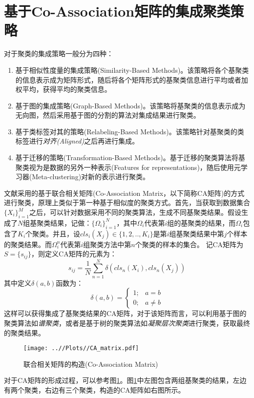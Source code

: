 \documentclass[UTF8, 12pt]{ctexart}
\begin{document}
\section{基于Co-Association矩阵的集成聚类策略}
	对于聚类的集成策略一般分为四种\cite{zhou2012ensemble}：
	\begin{enumerate}
		\item 基于相似性度量的集成策略(Similarity-Based Methods)。该策略将各个基聚类的信息表示成为矩阵形式，随后将各个矩阵形式的基聚类信息进行平均或者加权平均，获得平均的聚类信息。
		\item 基于图的集成策略(Graph-Based Methods)。该策略将基聚类的信息表示成为无向图，然后采用基于图的分割的算法对集成结果进行聚类。
		\item 基于类标签对其的策略(Relabeling-Based Methods)。该策略针对基聚类的类标签进行\emph{对齐(Aligned)}之后再进行集成。
		\item 基于迁移的策略(Transformation-Based Methods)。基于迁移的聚类算法将基聚类视为是数据的另外一种表示(Features for representations)，随后使用元学习器(Meta-clustering)对新的表示进行聚类。
	\end{enumerate}
	文献\cite{huang2017locally}采用的基于联合相关矩阵(Co-Association Matrix，以下简称CA矩阵)的方式进行聚类，原理上类似于第一种基于相似度的聚类方式。首先，当获取到数据集合$\{X_{i}\}_{i=1}^{M}$之后，可以针对数据采用不同的聚类算法，生成不同基聚类结果。假设生成了$N$组基聚类结果，记做：$\{\Omega_{i}\}_{i=1}^{N}$，其中$\Omega_{i}$代表第$i$组的基聚类的结果，而$\Omega_{i}$包含了$K_{i}$个聚类。并且，设$cls_{i}(X_{j})\in\{1, 2, .., K_{i}\}$是第$i$组基聚类结果中第$j$个样本的聚类结果。而$\Omega_{i}^{n}$代表第$i$组聚类方法中第$n$个聚类的样本的集合。
	记CA矩阵为$S=\{s_{ij}\}$，则定义CA矩阵的元素为：
	\begin{equation}
		s_{ij} = \frac{1}{N}\sum_{n=1}^{N}\delta(cls_{n}(X_{i}), cls_{n}(X_{j}))
	\end{equation}
	其中定义$\delta(a, b)$函数为：
	\begin{equation}
	\delta(a, b) = 
		\begin{cases}
			1; & a = b \\
			0; & a \neq b 
		\end{cases}
	\end{equation}
	这样可以获得集成了基聚类结果的CA矩阵，对于该矩阵而言，可以利用基于图的聚类算法如\emph{谱聚类}，或者是基于树的聚类算法如\emph{凝聚层次聚类}进行聚类，获取最终的聚类结果。
	
	\begin{figure}[H]
		\centering
		\texttt{[image: ..//Plots//CA\_matrix.pdf]}
		\caption{联合相关矩阵的构造(Co-Association Matrix)}
		\label{caMat}
		\vspace{-0.5em}
	\end{figure}
	对于CA矩阵的形成过程，可以参考图\ref{caMat}。图\ref{caMat}中左图包含两组基聚类的结果，左边有两个聚类，右边有三个聚类，构造的CA矩阵如右图所示。
	
\end{document}
